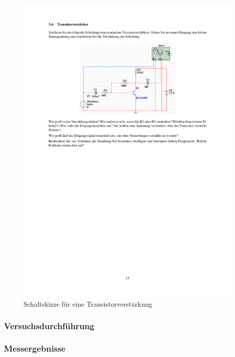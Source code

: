 \documentclass[12pt,a4paper]{article}
\begin{document}
\begin{figure}[H] 
  \centering
    \includegraphics[trim = 10mm 180mm 10mm 40mm, clip, scale = 1]{ep5_14[Page17].pdf}
  	\caption[Schaltskizze für eine Transistorverstärkung]{Schaltskizze für eine Transistorverstärkung\footnotemark}
  \label{fig:1}
\end{figure}

\subsubsection{Versuchsdurchführung}

\subsubsection{Messergebnisse}
\end{document}
